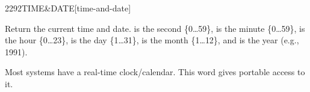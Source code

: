 \begin{worddef}[TIMEandDATE]{2292}{TIME\&DATE}[time-and-date]
\item {}

	Return the current time and date.
	 is the second \{0{\ldots}59\},
	 is the minute \{0{\ldots}59\},
	 is the hour \{0{\ldots}23\},
	 is the day \{1{\ldots}31\},
	 is the month \{1{\ldots}12\}, and
	 is the year (e.g., 1991).

	\begin{defer}
	\rationale %
		Most systems have a real-time clock/calendar.
		This word gives portable access to it.
	\end{defer}
\end{worddef}
